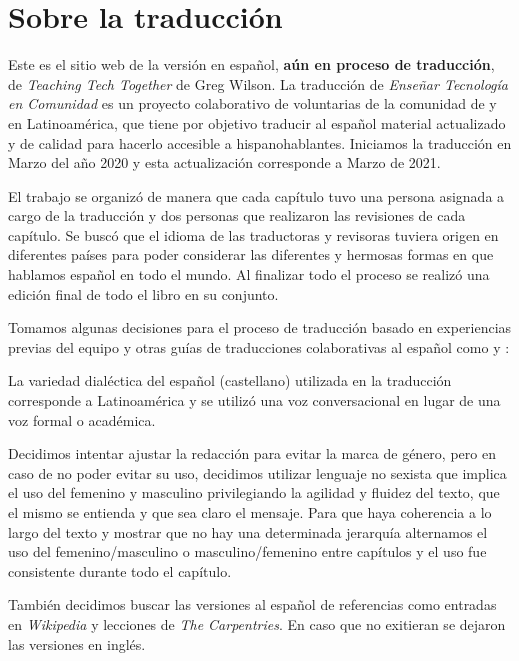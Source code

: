 \chapter*{Sobre la traducción}

Este es el sitio web de la versión en español, \textbf{aún en proceso de traducción}, de \emph{Teaching Tech Together} de Greg Wilson.
La traducción de \emph{Enseñar Tecnología en Comunidad} es un proyecto colaborativo
de voluntarias de la comunidad de  y 
 en Latinoamérica,
que tiene por objetivo traducir al español material actualizado 
y de calidad para hacerlo accesible a hispanohablantes.
Iniciamos la traducción en Marzo del año 2020 y esta actualización corresponde a Marzo de 2021.

El trabajo se organizó de manera que cada capítulo tuvo una persona asignada a cargo de la traducción 
y dos personas que realizaron las revisiones de cada capítulo.  
Se buscó que el idioma de las traductoras y revisoras tuviera origen en diferentes países para
poder considerar las diferentes y hermosas formas en que hablamos español en todo el mundo.
Al finalizar todo el proceso se realizó una edición final de todo el libro en su conjunto.

Tomamos algunas decisiones para el proceso de traducción basado en experiencias previas
del equipo y otras guías de traducciones colaborativas al español como 
y :

La variedad dialéctica del español (castellano) utilizada en la traducción corresponde 
a Latinoamérica y se utilizó una voz conversacional en lugar de una voz formal o académica.

Decidimos intentar ajustar la redacción para evitar la marca de género, pero
en caso de no poder evitar su uso, decidimos utilizar lenguaje no sexista  
que implica el uso del femenino y masculino privilegiando la agilidad y fluidez del texto, 
que el mismo se entienda y que sea claro el mensaje. Para que haya coherencia 
a lo largo del texto y mostrar que no hay una determinada jerarquía 
alternamos el uso del femenino/masculino o masculino/femenino entre capítulos 
y el uso fue consistente durante todo el capítulo. 

También decidimos buscar las versiones al español de referencias como 
entradas en \emph{Wikipedia} y lecciones de \emph{The Carpentries}.  En caso que no exitieran 
se dejaron las versiones en inglés.

